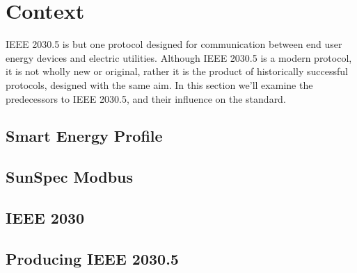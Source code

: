 \chapter{Context}\label{ch:context}

IEEE 2030.5 is but one protocol designed for communication between end user energy devices and electric utilities. 
Although IEEE 2030.5 is a modern protocol, it is not wholly new or original, rather it is the product of historically successful protocols, designed with the same aim.
In this section we'll examine the predecessors to IEEE 2030.5, and their influence on the standard.

\section{Smart Energy Profile}


\section{SunSpec Modbus}


\section{IEEE 2030}


\section{Producing IEEE 2030.5}



